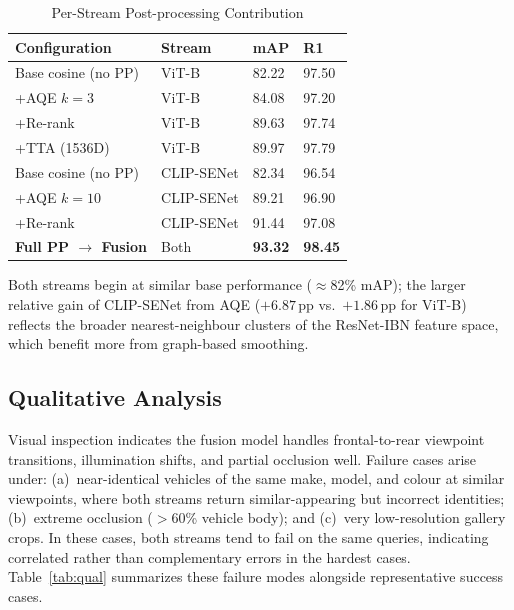 \documentclass[11pt]{article}
\begin{document}
\begin{table}[!t]
  \centering
  \caption{Per-Stream Post-processing Contribution}
  \label{tab:pp_contrib}
  \begin{tabular}{L{3.4cm}L{1.6cm}C{1.0cm}C{1.0cm}}
    \toprule
    Configuration & Stream & mAP & R1 \\
    \midrule
    Base cosine (no PP)              & ViT-B      & 82.22 & 97.50 \\
    +AQE $k{=}3$                     & ViT-B      & 84.08 & 97.20 \\
    +Re-rank                         & ViT-B      & 89.63 & 97.74 \\
    +TTA (1536D)                     & ViT-B      & 89.97 & 97.79 \\
    \midrule
    Base cosine (no PP)              & CLIP-SENet & 82.34 & 96.54 \\
    +AQE $k{=}10$                    & CLIP-SENet & 89.21 & 96.90 \\
    +Re-rank                         & CLIP-SENet & 91.44 & 97.08 \\
    \midrule
    \textbf{Full PP $\to$ Fusion}    & Both       & \textbf{93.32} & \textbf{98.45} \\
    \bottomrule
  \end{tabular}
\end{table}

Both streams begin at similar base performance ($\approx$82\% mAP);
the larger relative gain of CLIP-SENet from AQE ($+6.87$\,pp vs.\ $+1.86$\,pp
for ViT-B) reflects the broader nearest-neighbour clusters of the
ResNet-IBN feature space, which benefit more from graph-based smoothing.

\subsection{Qualitative Analysis}

Visual inspection indicates the fusion model handles frontal-to-rear viewpoint
transitions, illumination shifts, and partial occlusion well. Failure cases
arise under: (a)~near-identical vehicles of the same make, model, and colour
at similar viewpoints, where both streams return similar-appearing but
incorrect identities; (b)~extreme occlusion ($>$60\% vehicle body);
and (c)~very low-resolution gallery crops. In these cases, both streams tend
to fail on the same queries, indicating correlated rather than complementary
errors in the hardest cases. Table~\ref{tab:qual} summarizes these failure
modes alongside representative success cases.
\end{document}
